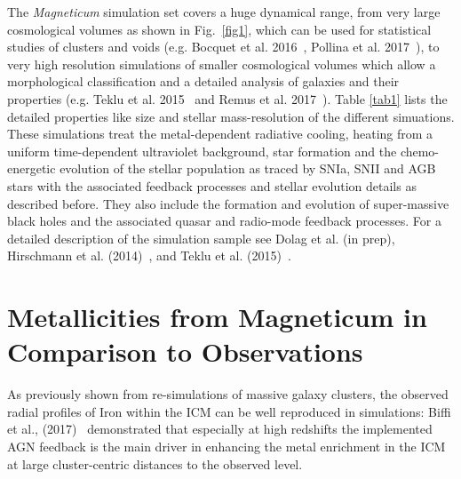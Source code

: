 \documentclass[galaxies,letter,accept,moreauthors,pdftex,10pt,a4paper,usenatbib]{mdpi}
\begin{document}
The {\it Magneticum} simulation set covers a huge dynamical range,
from very large cosmological volumes as shown in Fig.~\ref{fig1},
which can be used for statistical studies of clusters and voids
(e.g. Bocquet et al.
2016~\cite{2016MNRAS.456.2361B}, Pollina et al. 2017~\cite{2017MNRAS.469..787P}), to very
high resolution simulations of smaller cosmological volumes which
allow a morphological classification and a detailed analysis of
galaxies and their properties (e.g. Teklu et al.
2015~\cite{Teklu2015} and Remus et al. 2017~\cite{Remus2017}).
Table \ref{tab1} lists the detailed properties like size and stellar mass-resolution
of the different simuations. These
simulations treat the metal-dependent radiative cooling, heating from
a uniform time-dependent ultraviolet background, star formation and
the chemo-energetic evolution of the stellar population as traced by
SNIa, SNII and AGB stars with the associated feedback processes and
stellar evolution details as described before.  They also include the
formation and evolution of super-massive black holes and the
associated quasar and radio-mode feedback processes. For a detailed
description of the simulation sample see Dolag et al. (in prep),
Hirschmann et al. (2014)~\cite{Hirschmann}, and Teklu et al.
(2015)~\cite{Teklu2015}.


\section{Metallicities from Magneticum in Comparison to Observations}

As previously shown from re-simulations of massive galaxy clusters,
the observed radial profiles of Iron within the ICM can be well
reproduced in simulations: Biffi et al., (2017)~\cite{Biffi2017}
demonstrated that especially at high redshifts the implemented AGN
feedback is the main driver in enhancing the metal enrichment in the
ICM at large cluster-centric distances to the observed level. 
\end{document}

